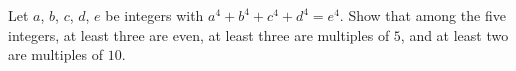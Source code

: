 Let $a$, $b$, $c$, $d$, $e$ be integers with $a^4 + b^4 + c^4 + d^4 = e^4$. Show that among the five integers, at least three are even, at least three are multiples of $5$, and at least two are multiples of $10$.
